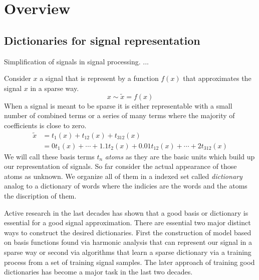 \chapter{Overview}

\section{Dictionaries for signal representation}
\label{sec:dicts}

Simplification of signals in signal processing. ... \Todo{}

Consider $x$ a signal that is represent by a
function $f(x)$ that approximates the signal $x$ in a sparse way.
\begin{equation*}
x \sim \tilde{x} = f\left(x\right)
\end{equation*}
When a signal is meant to be sparse it is either representable with a small
number of combined terms or a series of many terms where the majority of
coefficients is close to zero. 
\begin{equation*}
\begin{split}
\tilde{x} & = t_{1}(x) + t_{12}(x) + t_{312}(x)\\
& = 0t_{1}(x) + \cdots + 1.1t_{2}(x) + 0.01t_{12}(x) + \cdots +
2t_{312}(x)
\end{split}
\end{equation*}
We will call these basis terms $t_n$ \emph{atoms} as they are the basic units
which build up our representation of signals. So far consider the actual
appearance of those atoms as unknown. We 
organize all of them in a indexed set called \emph{dictionary} analog to a
dictionary of words where the indicies are the words and the atoms the
discription of them. 

Active research \cite{} in the last decades has shown that a good basis or
dictionary is essential for a good signal approximation.
There are essential two major distinct ways to construct the 
desired dictionaries. First the construction of model based on basis functions
found via harmonic analysis that can represent our signal in a sparse way or
second via algorithms that learn a sparse dictionary via a training process from
a set of training signal samples. The later approach of training good
dictionaries has become a major task in the last two decades\cite{Mairal2010}.



